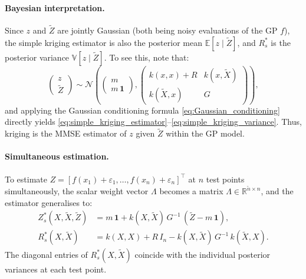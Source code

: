 \paragraph{Bayesian interpretation.} Since $z$ and $\tilde{Z}$ are jointly
Gaussian (both being noisy evaluations of the GP $f$), the simple kriging
estimator is also the posterior mean $\mathbb{E}[z \mid \tilde{Z}]$, and
$R^*_s$ is the posterior variance $\mathbb{V}[z \mid \tilde{Z}]$. To see
this, note that:
\begin{equation}
    \begin{pmatrix} z \\ \tilde{Z} \end{pmatrix}
    \sim \mathcal{N}\!\left(
        \begin{pmatrix} m \\ m\,\mathbf{1} \end{pmatrix},
        \begin{pmatrix}
            k(x,x) + R & k(x,\tilde{X}) \\
            k(\tilde{X},x) & G
        \end{pmatrix}
    \right),
    \label{eq:joint_GP}
\end{equation}
and applying the Gaussian conditioning formula \eqref{eq:Gaussian_conditioning}
directly yields \eqref{eq:simple_kriging_estimator}--\eqref{eq:simple_kriging_variance}.
Thus, kriging is the MMSE estimator of $z$ given $\tilde{Z}$ within the GP model.

\paragraph{Simultaneous estimation.} To estimate $Z = [f(x_1) + \varepsilon_1,
\ldots, f(x_n) + \varepsilon_n]^\top$ at $n$ test points simultaneously, the
scalar weight vector $\Lambda$ becomes a matrix $\Lambda \in \mathbb{R}^{\tilde{n}
\times n}$, and the estimator generalises to:
\begin{align}
    Z^*_s(X, \tilde{X}, \tilde{Z})
    &= m\,\mathbf{1} + k(X, \tilde{X})\,G^{-1}\,(\tilde{Z} - m\,\mathbf{1}),
    \label{eq:simple_kriging_batch} \\
    R^*_s(X, \tilde{X})
    &= k(X,X) + R\,I_n - k(X,\tilde{X})\,G^{-1}\,k(\tilde{X},X).
    \label{eq:simple_kriging_batch_var}
\end{align}
The diagonal entries of $R^*_s(X, \tilde{X})$ coincide with the individual
posterior variances at each test point.

